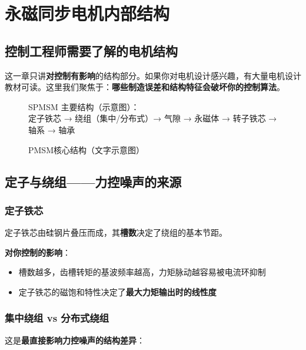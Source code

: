 \chapter{永磁同步电机内部结构}
\label{ch:pmsm}

\section{控制工程师需要了解的电机结构}

这一章只讲\textbf{对控制有影响}的结构部分。如果你对电机设计感兴趣，有大量电机设计教材可读。这里我们聚焦于：\textbf{哪些制造误差和结构特征会破坏你的控制算法}。

\begin{figure}[H]
\centering
\begin{tcolorbox}[colback=lightgray, colframe=primaryblue]
\centering
SPMSM 主要结构（示意图）：\\
定子铁芯 → 绕组（集中/分布式）→ 气隙 → 永磁体 → 转子铁芯 → 轴系 → 轴承
\end{tcolorbox}
\caption{PMSM核心结构（文字示意图）}
\label{fig:pmsm_structure}
\end{figure}

\section{定子与绕组——力控噪声的来源}

\subsection{定子铁芯}

定子铁芯由硅钢片叠压而成，其\textbf{槽数}决定了绕组的基本节距。

\textbf{对你控制的影响}：
\begin{itemize}
  \item 槽数越多，齿槽转矩的基波频率越高，力矩脉动越容易被电流环抑制
  \item 定子铁芯的磁饱和特性决定了\textbf{最大力矩输出时的线性度}
\end{itemize}

\subsection{集中绕组 vs 分布式绕组}

这是\textbf{最直接影响力控噪声的结构差异}：

